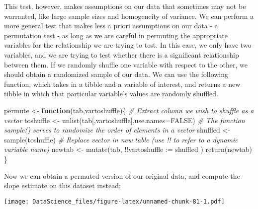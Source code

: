 \documentclass[
]{book}
\newenvironment{Shaded}{\begin{snugshade}}{\end{snugshade}}
\newcommand{\AttributeTok}[1]{\textcolor[rgb]{0.77,0.63,0.00}{#1}}
\newcommand{\CommentTok}[1]{\textcolor[rgb]{0.56,0.35,0.01}{\textit{#1}}}
\newcommand{\ConstantTok}[1]{\textcolor[rgb]{0.00,0.00,0.00}{#1}}
\newcommand{\ControlFlowTok}[1]{\textcolor[rgb]{0.13,0.29,0.53}{\textbf{#1}}}
\newcommand{\FunctionTok}[1]{\textcolor[rgb]{0.00,0.00,0.00}{#1}}
\newcommand{\NormalTok}[1]{#1}
\newcommand{\OtherTok}[1]{\textcolor[rgb]{0.56,0.35,0.01}{#1}}
\newcommand{\SpecialCharTok}[1]{\textcolor[rgb]{0.00,0.00,0.00}{#1}}
\newcommand{\StringTok}[1]{\textcolor[rgb]{0.31,0.60,0.02}{#1}}
\begin{document}
This test, however, makes assumptions on our data that sometimes may not be warranted, like large sample sizes and homogeneity of variance. We can perform a more general test that makes less a priori assumptions on our data - a permutation test - as long as we are careful in permuting the appropriate variables for the relationship we are trying to test. In this case, we only have two variables, and we are trying to test whether there is a significant relationship between them. If we randomly shuffle one variable with respect to the other, we should obtain a randomized sample of our data. We can use the following function, which takes in a tibble and a variable of interest, and returns a new tibble in which that particular variable's values are randomly shuffled.

\begin{Shaded}
\begin{Highlighting}[]
\NormalTok{permute }\OtherTok{\textless{}{-}} \ControlFlowTok{function}\NormalTok{(tab,vartoshuffle)\{}
  \CommentTok{\# Extract column we wish to shuffle as a vector}
\NormalTok{  toshuffle }\OtherTok{\textless{}{-}} \FunctionTok{unlist}\NormalTok{(tab[,vartoshuffle],}\AttributeTok{use.names=}\ConstantTok{FALSE}\NormalTok{)}
  \CommentTok{\# The function sample() serves to randomize the order of elements in a vector}
\NormalTok{  shuffled }\OtherTok{\textless{}{-}} \FunctionTok{sample}\NormalTok{(toshuffle)}
  \CommentTok{\# Replace vector in new table (use !! to refer to a dynamic variable name)}
\NormalTok{  newtab }\OtherTok{\textless{}{-}} \FunctionTok{mutate}\NormalTok{(tab, }\SpecialCharTok{!!}\AttributeTok{vartoshuffle :=}\NormalTok{ shuffled )}
  \FunctionTok{return}\NormalTok{(newtab)}
\NormalTok{\}}
\end{Highlighting}
\end{Shaded}

Now we can obtain a permuted version of our original data, and compute the slope estimate on this dataset instead:

\begin{Shaded}
\end{Shaded}

\texttt{[image: DataScience\_files/figure-latex/unnamed-chunk-81-1.pdf]}
\end{document}
